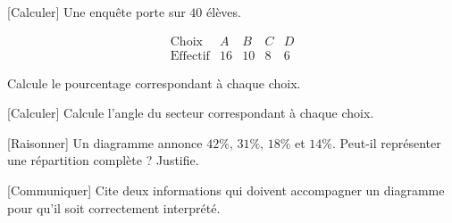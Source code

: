 \documentclass[12pt,a4paper]{article}
\begin{document}

[Calculer]
Une enquête porte sur \(40\) élèves.

\[
\begin{array}{c|cccc}
\text{Choix} & A & B & C & D\\
\hline
\text{Effectif} & 16 & 10 & 8 & 6
\end{array}
\]

Calcule le pourcentage correspondant à chaque choix. 


[Calculer]
Calcule l'angle du secteur correspondant à chaque choix. 


[Raisonner]
Un diagramme annonce \(42\%\), \(31\%\), \(18\%\) et \(14\%\).
Peut-il représenter une répartition complète ? Justifie. 


[Communiquer]
Cite deux informations qui doivent accompagner un diagramme
pour qu'il soit correctement interprété. 

\end{document}
